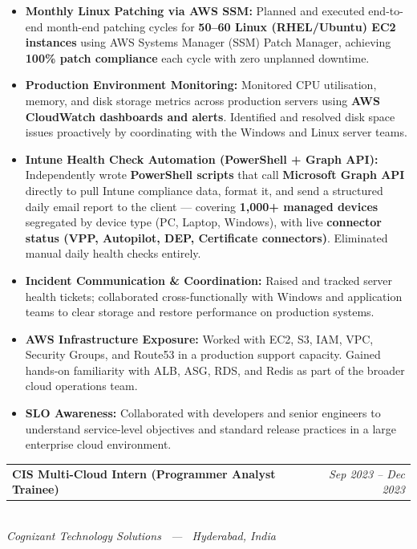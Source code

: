 \documentclass[10pt, a4paper]{article}
\makeatletter
\newcommand{\expentry}[3]{%
  \vspace{6pt}%
  \noindent
  \begin{tabularx}{\linewidth}{@{}X r@{}}
    \textbf{\color{darkgray}#1} & \textit{\color{lightgray}#3}
  \end{tabularx}\\[-2pt]
  \textit{\color{headblue}\small #2}%
  \vspace{3pt}%
}
\makeatother
\begin{document}
\begin{itemize}
  \item \textbf{Monthly Linux Patching via AWS SSM:} Planned and executed end-to-end
        month-end patching cycles for \textbf{50--60 Linux (RHEL/Ubuntu) EC2 instances}
        using AWS Systems Manager (SSM) Patch Manager, achieving
        \textbf{100\% patch compliance} each cycle with zero unplanned downtime.

  \item \textbf{Production Environment Monitoring:} Monitored CPU utilisation, memory,
        and disk storage metrics across production servers using \textbf{AWS CloudWatch
        dashboards and alerts}. Identified and resolved disk space issues proactively
        by coordinating with the Windows and Linux server teams.

  \item \textbf{Intune Health Check Automation (PowerShell + Graph API):}
        Independently wrote \textbf{PowerShell scripts} that call \textbf{Microsoft
        Graph API} directly to pull Intune compliance data, format it, and send a
        structured daily email report to the client --- covering \textbf{1,000+
        managed devices} segregated by device type (PC, Laptop, Windows), with live
        \textbf{connector status (VPP, Autopilot, DEP, Certificate connectors)}.
        Eliminated manual daily health checks entirely.

  \item \textbf{Incident Communication \& Coordination:} Raised and tracked server
        health tickets; collaborated cross-functionally with Windows and application
        teams to clear storage and restore performance on production systems.

  \item \textbf{AWS Infrastructure Exposure:} Worked with EC2, S3, IAM, VPC, Security
        Groups, and Route53 in a production support capacity. Gained hands-on
        familiarity with ALB, ASG, RDS, and Redis as part of the broader cloud
        operations team.

  \item \textbf{SLO Awareness:} Collaborated with developers and senior engineers to
        understand service-level objectives and standard release practices in a large
        enterprise cloud environment.
\end{itemize}

\vspace{4pt}

\expentry%
  {CIS Multi-Cloud Intern (Programmer Analyst Trainee)}%
  {Cognizant Technology Solutions \ --- \ Hyderabad, India}%
  {Sep 2023 -- Dec 2023}
\end{document}
